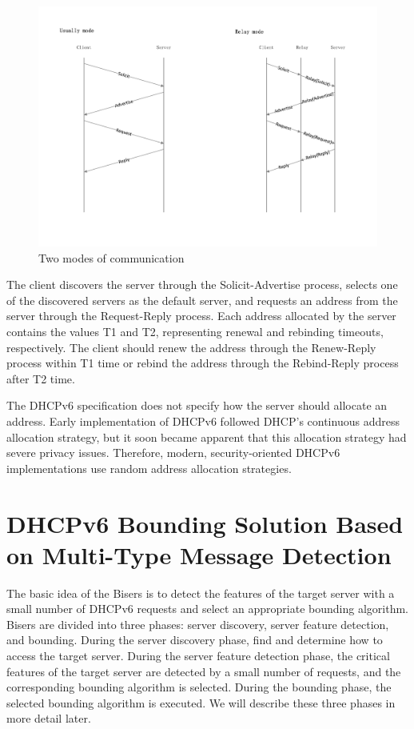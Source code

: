\documentclass[conference]{IEEEtran}
\begin{document}
\begin{figure}[htbp]
  \centerline{\includegraphics[scale=0.3]{relay.pdf}}
  \caption{Two modes of communication}
  \label{figRelay}
\end{figure}

The client discovers the server through the Solicit-Advertise process,
selects one of the discovered servers as the default server, and
requests an address from the server through the Request-Reply
process. Each address allocated by the server contains the values T1
and T2, representing renewal and rebinding timeouts, respectively. The
client should renew the address through the Renew-Reply process within
T1 time or rebind the address through the Rebind-Reply process after
T2 time.

The DHCPv6 specification does not specify how the server should
allocate an address. Early implementation of DHCPv6 followed DHCP's
continuous address allocation strategy, but it soon became apparent
that this allocation strategy had severe privacy issues. Therefore,
modern, security-oriented DHCPv6 implementations use random address
allocation strategies.

\section{DHCPv6 Bounding Solution Based on Multi-Type Message Detection}

The basic idea of the Bisers is to detect the features of the target
server with a small number of DHCPv6 requests and select an
appropriate bounding algorithm. Bisers are divided into three phases:
server discovery, server feature detection, and bounding. During the
server discovery phase, find and determine how to access the target
server. During the server feature detection phase, the critical
features of the target server are detected by a small number of
requests, and the corresponding bounding algorithm is selected. During
the bounding phase, the selected bounding algorithm is executed. We
will describe these three phases in more detail later.
\end{document}
